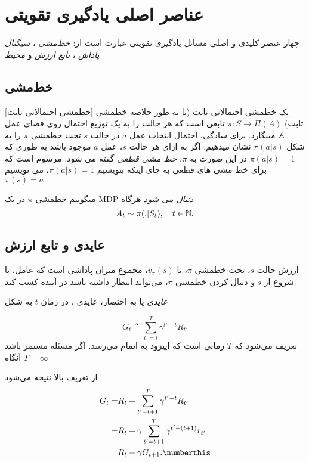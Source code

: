 \section{عناصر اصلی یادگیری تقویتی}
چهار عنصر کلیدی و اصلی مسائل یادگیری تقویتی عبارت است از:
\textit{خط‌مشی} ، 
\textit{سیگنال پاداش} ،
\textit{تابع ارزش}  
و
\textit{محیط} 
\subsection{خط‌مشی}

[خط\nf مشی احتمالاتی ثابت]
یک خط\nf مشی احتمالاتی ثابت (یا به طور خلاصه خط\nf مشی ثابت) 
$\pi: S \to \Pi(A)$
تابعی است که هر حالت را به یک توزیع احتمال روی فضای عمل
$\EuScript{A}$
 می\nf نگارد.
برای سادگی، احتمال انتخاب عمل $a$ در حالت $s$ تحت خط\nf مشی $\pi$ را به شکل
$\pi(a|s)$
نشان می\nf دهیم.
اگر به ازای هر حالت $s$، عمل $a$ موجود باشد به طوری که 
$\pi(a|s) = 1$
در این صورت به $\pi$،
\textit{خط مشی قطعی}
گفته می شود. مرسوم است که برای خط مشی های قطعی به جای اینکه بنویسیم 
$\pi(a|s) = 1$،
می نویسیم
$\pi(s) = a$


می\nf گوییم خط\nf مشی $\pi$ در یک
 MDP
  \textit{دنبال می
  	\nf
  	 شود}
   هرگاه
$$A_t \sim \pi(. |S_t),	 \quad t \in \mathbb{N}.$$




\subsection{عایدی و تابع ارزش}

ارزش حالت $s$، تحت خط\nf مشی $\pi$، یا
 $v_\pi(s)$،
مجموع میزان پاداشی است که عامل، با شروع از $s$ و دنبال کردن خط\nf مشی $\pi$، می‌تواند انتظار داشته باشد در آینده کسب کند.

\textit{عایدی}
 یا به اختصار، عایدی ، در زمان $t$ به شکل

$$G_t \triangleq \sum_{t'=t}^{T} \gamma^{t'-t} R_{t'}$$
تعریف می‌شود که $T$ زمانی است که اپیزود به اتمام می‌رسد. اگر مسئله مستمر باشد آنگاه 
$T=\infty$

از تعریف بالا نتیجه می‌شود 
\begin{align}
G_t =& R_t + \sum_{t'=t+1}^{T} \gamma^{t'-t} R_{t'} \nonumber \\
=& R_t + \gamma \sum_{t'=t+1}^{T} \gamma^{t' - (t+1)} r_{t'} \nonumber \\
=& R_t + \gamma G_{t+1}. \numberthis
\end{align}

